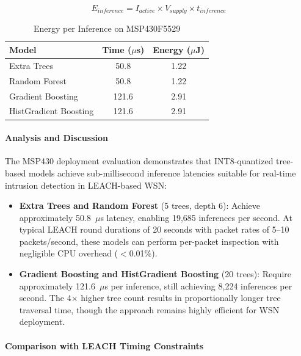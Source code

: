 \begin{equation}
    E_{inference} = I_{active} \times V_{supply} \times t_{inference}
\end{equation}

\begin{table}[htbp]
\centering
\caption{Energy per Inference on MSP430F5529}
\label{tab:msp430_energy}
\begin{tabular}{lcc}
\hline
\textbf{Model} & \textbf{Time ($\mu$s)} & \textbf{Energy ($\mu$J)} \\
\hline
Extra Trees & 50.8 & 1.22 \\
Random Forest & 50.8 & 1.22 \\
Gradient Boosting & 121.6 & 2.91 \\
HistGradient Boosting & 121.6 & 2.91 \\
\hline
\end{tabular}
\end{table}

\paragraph{Analysis and Discussion}

The MSP430 deployment evaluation demonstrates that INT8-quantized tree-based models achieve sub-millisecond inference latencies suitable for real-time intrusion detection in LEACH-based WSN:

\begin{itemize}
    \item \textbf{Extra Trees and Random Forest} (5 trees, depth 6): Achieve approximately 50.8~$\mu$s latency, enabling 19,685 inferences per second. At typical LEACH round durations of 20 seconds with packet rates of 5--10 packets/second, these models can perform per-packet inspection with negligible CPU overhead ($<$0.01\%).
    
    \item \textbf{Gradient Boosting and HistGradient Boosting} (20 trees): Require approximately 121.6~$\mu$s per inference, still achieving 8,224 inferences per second. The 4$\times$ higher tree count results in proportionally longer tree traversal time, though the approach remains highly efficient for WSN deployment.
\end{itemize}

\paragraph{Comparison with LEACH Timing Constraints}

